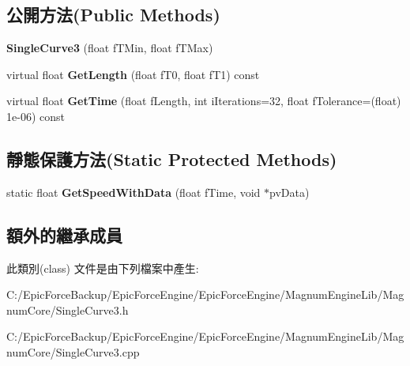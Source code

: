 \subsection*{公開方法(Public Methods)}
\begin{DoxyCompactItemize}
\item 
{\bfseries Single\+Curve3} (float f\+T\+Min, float f\+T\+Max)\hypertarget{class_magnum_1_1_single_curve3_a848eef494fdbf8e060ad376943aafdc0}{}\label{class_magnum_1_1_single_curve3_a848eef494fdbf8e060ad376943aafdc0}

\item 
virtual float {\bfseries Get\+Length} (float f\+T0, float f\+T1) const \hypertarget{class_magnum_1_1_single_curve3_ae8db6d51460bb4490dc11a55bdbf36b1}{}\label{class_magnum_1_1_single_curve3_ae8db6d51460bb4490dc11a55bdbf36b1}

\item 
virtual float {\bfseries Get\+Time} (float f\+Length, int i\+Iterations=32, float f\+Tolerance=(float) 1e-\/06) const \hypertarget{class_magnum_1_1_single_curve3_a45098e62ac26b454ef5629573c393f44}{}\label{class_magnum_1_1_single_curve3_a45098e62ac26b454ef5629573c393f44}

\end{DoxyCompactItemize}
\subsection*{靜態保護方法(Static Protected Methods)}
\begin{DoxyCompactItemize}
\item 
static float {\bfseries Get\+Speed\+With\+Data} (float f\+Time, void $\ast$pv\+Data)\hypertarget{class_magnum_1_1_single_curve3_a06becaa4e882cbc02ec55cf11de1f38a}{}\label{class_magnum_1_1_single_curve3_a06becaa4e882cbc02ec55cf11de1f38a}

\end{DoxyCompactItemize}
\subsection*{額外的繼承成員}


此類別(class) 文件是由下列檔案中產生\+:\begin{DoxyCompactItemize}
\item 
C\+:/\+Epic\+Force\+Backup/\+Epic\+Force\+Engine/\+Epic\+Force\+Engine/\+Magnum\+Engine\+Lib/\+Magnum\+Core/Single\+Curve3.\+h\item 
C\+:/\+Epic\+Force\+Backup/\+Epic\+Force\+Engine/\+Epic\+Force\+Engine/\+Magnum\+Engine\+Lib/\+Magnum\+Core/Single\+Curve3.\+cpp\end{DoxyCompactItemize}
